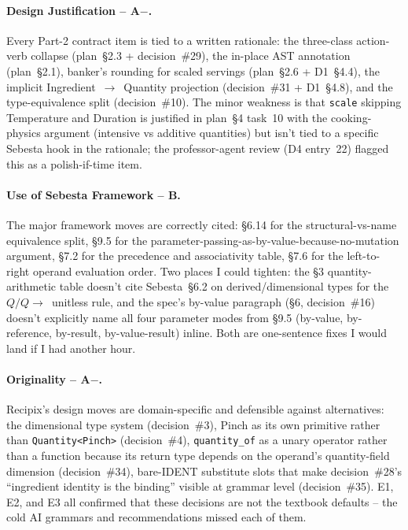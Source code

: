 \documentclass[11pt,a4paper]{article}
\begin{document}
\paragraph{Design Justification -- A$-$.} Every Part-2 contract item
is tied to a written rationale: the three-class action-verb collapse
(plan~\S2.3 + decision~\#29), the in-place AST annotation
(plan~\S2.1), banker's rounding for scaled servings (plan~\S2.6 +
D1~\S4.4), the implicit Ingredient~$\to$~Quantity projection
(decision~\#31 + D1~\S4.8), and the type-equivalence split
(decision~\#10). The minor weakness is that \texttt{scale} skipping
Temperature and Duration is justified in plan~\S4 task~10 with the
cooking-physics argument (intensive vs additive quantities) but isn't
tied to a specific Sebesta hook in the rationale; the professor-agent
review (D4 entry~22) flagged this as a polish-if-time item.

\paragraph{Use of Sebesta Framework -- B.} The major framework moves
are correctly cited: \S6.14 for the structural-vs-name equivalence
split, \S9.5 for the parameter-passing-as-by-value-because-no-mutation
argument, \S7.2 for the precedence and associativity table, \S7.6 for
the left-to-right operand evaluation order. Two places I could tighten:
the \S3 quantity-arithmetic table doesn't cite Sebesta~\S6.2 on
derived/dimensional types for the $Q/Q \to$~unitless rule, and the
spec's by-value paragraph (\S6, decision~\#16) doesn't explicitly name
all four parameter modes from \S9.5 (by-value, by-reference, by-result,
by-value-result) inline. Both are one-sentence fixes I would land if
I had another hour.

\paragraph{Originality -- A$-$.} Recipix's design moves are
domain-specific and defensible against alternatives: the dimensional
type system (decision~\#3), Pinch as its own primitive rather than
\texttt{Quantity<Pinch>} (decision~\#4), \texttt{quantity\_of} as a
unary operator rather than a function because its return type depends
on the operand's quantity-field dimension (decision~\#34),
bare-IDENT substitute slots that make decision~\#28's ``ingredient
identity is the binding'' visible at grammar level (decision~\#35).
E1, E2, and E3 all confirmed that these decisions are not the
textbook defaults -- the cold AI grammars and recommendations missed
each of them.
\end{document}
